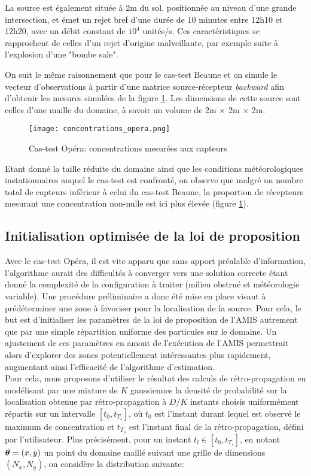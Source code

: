 La source est également située à 2m du sol, positionnée au niveau d'une grande intersection, et émet un rejet bref d'une durée de 10 minutes entre 12h10 et 12h20, avec un débit constant de $10^4$ unités/s. Ces caractéristiques se rapprochent de celles d'un rejet d'origine malveillante, par exemple suite à l'explosion d'une "bombe sale". 

On suit le même raisonnement que pour le cas-test Beaune et on simule le vecteur d'observations à partir d'une matrice source-récepteur \textit{backward} afin d'obtenir les mesures simulées de la figure \ref{fig_opera_obs}. Les dimensions de cette source sont celles d'une maille du domaine, à savoir un volume de 2m $\times$ 2m $\times$ 2m.

\begin{figure}[h!]
	\centering
	\texttt{[image: concentrations\_opera.png]}
	\caption{Cas-test Opéra: concentrations mesurées aux capteurs}
	\label{fig_opera_obs}
\end{figure}

Etant donné la taille réduite du domaine ainsi que les conditions météorologiques instationnaires auquel le cas-test est confronté, on observe que malgré un nombre total de capteurs inférieur à celui du cas-test Beaune, la proportion de récepteurs mesurant une concentration non-nulle est ici plus élevée (figure \ref{fig_opera_obs}).


\subsection{Initialisation optimisée de la loi de proposition}

Avec le cas-test Opéra, il est vite apparu que sans apport préalable d'information, l'algorithme aurait des difficultés à converger vers une solution correcte étant donné la complexité {de la configuration à traiter (milieu obstrué et météorologie variable)}. Une procédure préliminaire a donc été mise en place {visant à prédéterminer une zone à favoriser pour la localisation de la source. Pour cela, le but est } d'initialiser les paramètres de la loi de proposition de l'AMIS autrement que par une simple répartition uniforme des particules sur le domaine. {Un ajustement de ces paramètres} en amont de l'exécution de l'AMIS permettrait alors d'explorer des zones potentiellement intéressantes plus rapidement, augmentant ainsi l'efficacité de l'algorithme d'estimation. \\

Pour cela, nous proposons d'utiliser le résultat des calculs de rétro-propagation en modélisant par une mixture de $K$ gaussiennes la densité de probabilité sur la localisation obtenue par rétro-propagation à $D/K$ instants choisis uniformément répartis sur un intervalle $[t_0, t_{T_s}]$, où $t_0$ est l'instant durant lequel est observé le maximum de concentration et {$t_{T_s}$ }est l'instant final de la rétro-propagation, défini par l'utilisateur. Plus précisément, pour un instant {$t_l \in [t_0,t_{T_s}]$}, en notant ${\bm{\theta}} = (x,y)$ un point du domaine maillé suivant une grille de dimensions $(N_x,N_y)$, on considère la distribution suivante:

